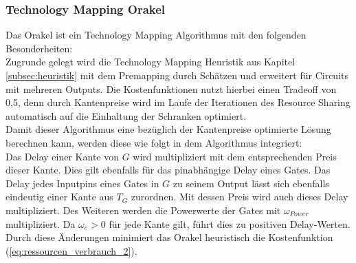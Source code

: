 \documentclass[11pt, a4paper, german]{article}
\newcommand{\TM}{Technology  Mapping }
\begin{document}
\subsubsection{\TM Orakel}
Das Orakel ist ein \TM Algorithmus mit den folgenden Besonderheiten: \\

Zugrunde gelegt wird die \TM Heuristik aus Kapitel \ref{subsec:heuristik} mit dem Premapping durch Schätzen und erweitert für Circuits mit mehreren Outputs. Die Kostenfunktionen nutzt hierbei einen Tradeoff von 0,5, denn durch Kantenpreise wird im Laufe der Iterationen des Resource Sharing automatisch auf die Einhaltung der Schranken optimiert. \\
Damit dieser Algorithmus eine bezüglich der Kantenpreise optimierte Lösung berechnen kann, werden diese wie folgt in dem Algorithmus integriert: \\
Das Delay einer Kante von $G$ wird multipliziert mit dem entsprechenden Preis dieser Kante. Dies gilt ebenfalls für das pinabhängige Delay eines Gates. Das Delay jedes Inputpins eines Gates in $G$ zu seinem Output lässt sich ebenfalls eindeutig einer Kante aus $T_G$ zurordnen. Mit dessen Preis wird auch dieses Delay multipliziert. Des Weiteren werden die Powerwerte der Gates mit $\omega_{Power}$ multipliziert. Da $\omega_e >0$ für jede Kante gilt, führt dies zu positiven Delay-Werten. 
Durch diese Änderungen minimiert das Orakel heuristisch die Kostenfunktion (\ref{eq:ressourcen_verbrauch_2}).
\end{document}
